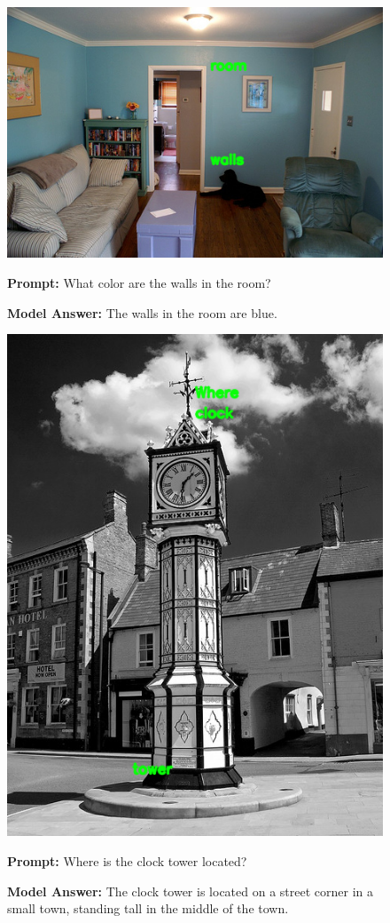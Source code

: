 \documentclass[11pt]{article}
\begin{document}
\begin{figure}[H]
    \centering
    \includegraphics[width=0.6\linewidth]{reordering_179.png}\par
    \vspace{1em}
    \raggedright
    \textbf{Prompt:} What color are the walls in the room?
    
    \textbf{Model Answer:} The walls in the room are blue.
\end{figure}

\begin{figure}[H]
    \centering
    \includegraphics[width=0.6\linewidth]{reordering_178.png}\par
    \vspace{1em}
    \raggedright
    \textbf{Prompt:} Where is the clock tower located?
    
    \textbf{Model Answer:} The clock tower is located on a street corner in a small town, standing tall in the middle of the town.
\end{figure}
\end{document}
